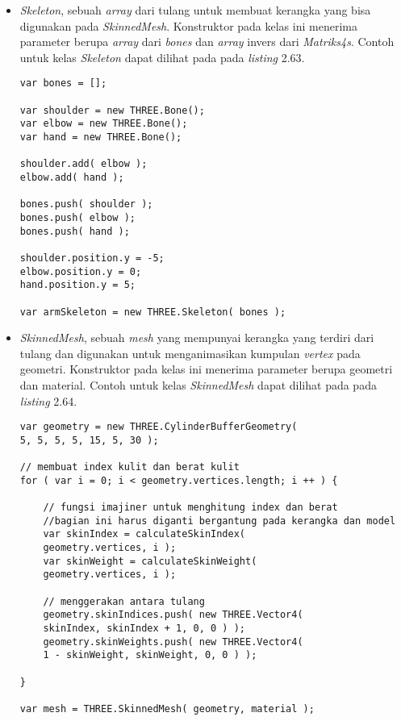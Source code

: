 \begin{itemize}
\begin{itemize}
	\item {\it Skeleton}, sebuah {\it array} dari tulang untuk membuat kerangka yang bisa digunakan pada {\it SkinnedMesh}. Konstruktor pada kelas ini menerima parameter berupa {\it array} dari {\it bones} dan {\it array} invers dari {\it Matriks4s}. Contoh untuk kelas {\it Skeleton} dapat dilihat pada pada {\it listing} 2.63.
	
\begin{lstlisting}[caption={Contoh penggunaan kelas {\it Skeleton}.},captionpos=b]
var bones = [];

var shoulder = new THREE.Bone();
var elbow = new THREE.Bone();
var hand = new THREE.Bone();

shoulder.add( elbow );
elbow.add( hand );

bones.push( shoulder );
bones.push( elbow );
bones.push( hand );

shoulder.position.y = -5;
elbow.position.y = 0;
hand.position.y = 5;

var armSkeleton = new THREE.Skeleton( bones );
\end{lstlisting}
	
	\item {\it SkinnedMesh}, sebuah {\it mesh} yang mempunyai kerangka yang terdiri dari tulang dan digunakan untuk menganimasikan kumpulan {\it vertex} pada geometri. Konstruktor pada kelas ini menerima parameter berupa geometri dan material. Contoh untuk kelas {\it SkinnedMesh} dapat dilihat pada pada {\it listing} 2.64.
	
\begin{lstlisting}[caption={Contoh penggunaan kelas {\it SkinnedMesh}.},captionpos=b]
var geometry = new THREE.CylinderBufferGeometry( 
5, 5, 5, 5, 15, 5, 30 );

// membuat index kulit dan berat kulit
for ( var i = 0; i < geometry.vertices.length; i ++ ) {

	// fungsi imajiner untuk menghitung index dan berat
	//bagian ini harus diganti bergantung pada kerangka dan model
	var skinIndex = calculateSkinIndex( 
	geometry.vertices, i );
	var skinWeight = calculateSkinWeight( 
	geometry.vertices, i );

	// menggerakan antara tulang
	geometry.skinIndices.push( new THREE.Vector4( 
	skinIndex, skinIndex + 1, 0, 0 ) );
	geometry.skinWeights.push( new THREE.Vector4(
	1 - skinWeight, skinWeight, 0, 0 ) );

}

var mesh = THREE.SkinnedMesh( geometry, material );


\end{lstlisting}
\end{itemize}
\end{itemize}
